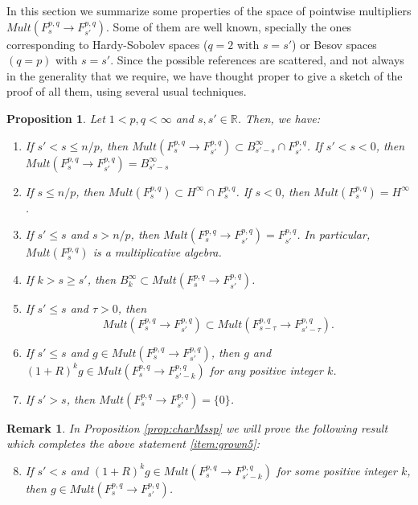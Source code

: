 \documentclass[12pt,twoside,leqno,final]{amsart}
\theoremstyle{plain}
\newtheorem{prop}[thm]{Proposition}
\newtheorem{rem}[thm]{Remark}
\begin{document}
In this section we summarize some properties of the space of pointwise multipliers  
$ Mult(F^{p,q}_s\to F^{p,q}_{s'})$. Some of them are well known, 
specially the ones corresponding to Hardy-Sobolev spaces ($q=2$ with $s=s'$) or 
Besov spaces $(q=p)$ with $s=s'$. Since the possible references  are scattered, and not always in the generality that we require, we have thought proper to give a sketch of the proof of all them, using several usual techniques.

\begin{prop}\label{prop:grown}
Let $1< p,q<\infty$ and $s,s'\in{{\mathbb R}}$.  Then, we have:   

\begin{enumerate}
	\item \label{item:grown1} If $s'<s\le n/p$, then $ Mult(F^{p,q}_s\to F^{p,q}_{s'})\subset B^\infty_{s'-s}\cap F^{p,q}_{s'}$. If $s'<s<0$, then $ Mult(F^{p,q}_s\to F^{p,q}_{s'})= B^\infty_{s'-s}$
	\item \label{item:grown2}If  $s\le n/p$, then $ Mult(F^{p,q}_s)\subset H^\infty\cap F^{p,q}_{s}$. If $s<0$, then $ Mult(F^{p,q}_s)= H^\infty$.
	\item \label{item:grown7} If $s'\le s$ and $s>n/p$,  then $Mult(F^{p,q}_s\to F^{p,q}_{s'})=F^{p,q}_{s'}$. In particular, $Mult(F^{p,q}_s)$ is a multiplicative algebra.
	\item \label{item:grown3} If $k>s\ge s'$, then $ B^\infty_k\subset Mult(F^{p,q}_s\to F^{p,q}_{s'})$.
	\item \label{item:grown4} If $s'\le s
	$ and $\tau>0$, then 
	$$
	Mult(F^{p,q}_{s}\to F^{p,q}_{s'})\subset Mult(F^{p,q}_{s-\tau}\to F^{p,q}_{s'-\tau}).
	$$
 	\item \label{item:grown5} If $s'\le s$ and $g\in Mult(F^{p,q}_s\to F^{p,q}_{s'})$, then 
$g$ and $(1+R)^k g\in Mult(F^{p,q}_s\to F^{p,q}_{s'-k})$ for any positive integer $k$.
	\item \label{item:grown6} If $s'>s$, then $Mult(F^{p,q}_s\to F^{p,q}_{s'})=\{0\}$.

\end{enumerate}
\end{prop}

\begin{rem}
In Proposition \ref{prop:charMssp} we  will prove the following result which completes the above statement \eqref{item:grown5}:

\begin{enumerate}\setcounter{enumi}{7}
	\item  If $s'<s$ and $(1+R)^k g\in Mult(F^{p,q}_s\to F^{p,q}_{s'-k})$ for some positive integer $k$, then $g\in Mult(F^{p,q}_s\to F^{p,q}_{s'})$.  
\end{enumerate}
\end{rem}
\end{document}
